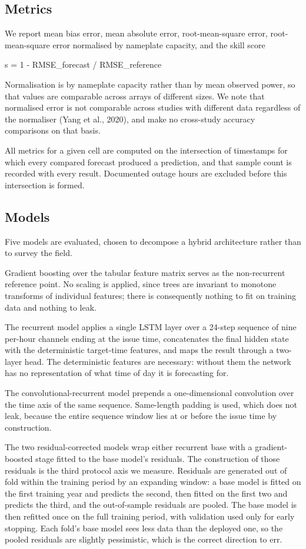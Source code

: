 \subsection{Metrics}

We report mean bias error, mean absolute error, root-mean-square error,
root-mean-square error normalised by nameplate capacity, and the skill
score

  s = 1 - RMSE\_forecast / RMSE\_reference

Normalisation is by nameplate capacity rather than by mean observed
power, so that values are comparable across arrays of different sizes.
We note that normalised error is not comparable across studies with
different data regardless of the normaliser (Yang et al., 2020), and make
no cross-study accuracy comparisons on that basis.

All metrics for a given cell are computed on the intersection of
timestamps for which every compared forecast produced a prediction, and
that sample count is recorded with every result. Documented outage hours
are excluded before this intersection is formed.

\subsection{Models}

Five models are evaluated, chosen to decompose a hybrid architecture
rather than to survey the field.

Gradient boosting over the tabular feature matrix serves as the
non-recurrent reference point. No scaling is applied, since trees are
invariant to monotone transforms of individual features; there is
consequently nothing to fit on training data and nothing to leak.

The recurrent model applies a single LSTM layer over a 24-step sequence
of nine per-hour channels ending at the issue time, concatenates the
final hidden state with the deterministic target-time features, and maps
the result through a two-layer head. The deterministic features are
necessary: without them the network has no representation of what time
of day it is forecasting for.

The convolutional-recurrent model prepends a one-dimensional
convolution over the time axis of the same sequence. Same-length padding
is used, which does not leak, because the entire sequence window lies at
or before the issue time by construction.

The two residual-corrected models wrap either recurrent base with a
gradient-boosted stage fitted to the base model's residuals. The
construction of those residuals is the third protocol axis we measure.
Residuals are generated out of fold within the training period by an
expanding window: a base model is fitted on the first training year and
predicts the second, then fitted on the first two and predicts the
third, and the out-of-sample residuals are pooled. The base model is
then refitted once on the full training period, with validation used
only for early stopping. Each fold's base model sees less data than the
deployed one, so the pooled residuals are slightly pessimistic, which is
the correct direction to err.

